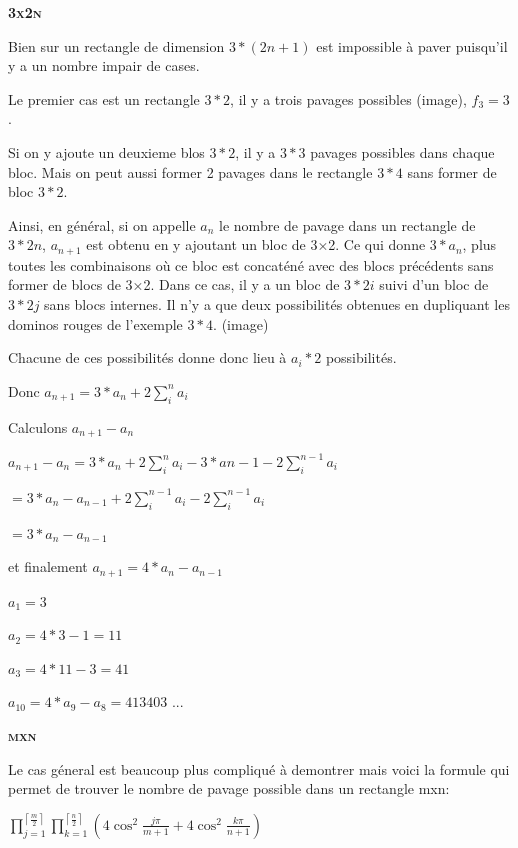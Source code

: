\documentclass{article}
\begin{document}
\hspace{1.5cm}

\textbf{\textsc{3x2n}}

Bien sur un rectangle de dimension $3*(2n+1)$ est impossible à paver puisqu'il y a un nombre impair de cases.

Le premier cas est un rectangle $3*2$, il y a trois pavages possibles (image), $f_{3} = 3$.

Si on y ajoute un deuxieme blos $3*2$, il y a $3*3$ pavages possibles dans chaque bloc.
Mais on peut aussi former 2 pavages dans le rectangle $3*4$ sans former de bloc $3*2$.

Ainsi, en général, si on appelle $a_{n}$ le nombre de pavage dans un rectangle de $3*2n$, $a_{n+1}$ est obtenu en y ajoutant un bloc de 3×2.
Ce qui donne $3*a_{n}$, plus toutes les combinaisons où ce bloc est concaténé avec des blocs précédents sans former de blocs de 3×2.
Dans ce cas, il y a un bloc de $3*2i$ suivi d'un bloc de $3*2j$ sans blocs internes. Il n'y a que deux possibilités obtenues en dupliquant les dominos rouges de l'exemple $3*4$. (image)

Chacune de ces possibilités donne donc lieu à $a_{i}*2$ possibilités.

Donc $a_{n+1} = 3*a_{n} + 2\sum_{i}^{n}a_{i}$

Calculons $a_{n+1} - a_{n}$

$a_{n+1} - a_{n}   = 3*a_{n} + 2\sum_{i}^{n}a_{i} - 3*an-1 - 2\sum_{i}^{n-1}a_{i}$

$= 3*a_{n} - a_{n-1} + 2\sum_{i}^{n-1}a_{i} - 2\sum_{i}^{n-1}a_{i}$

$= 3*a_{n} - a_{n-1}$

et finalement $a_{n+1} = 4*a_{n} - a_{n-1}$

$a_{1} = 3$

$a_{2} = 4*3 - 1 = 11$

$a_{3} = 4*11 - 3 = 41$

$a_{10} = 4*a_{9} - a_{8} = 413403$ ...


\hspace{1.5cm}

\textbf{\textsc{mxn}}

Le cas géneral est beaucoup plus compliqué à demontrer mais voici la formule qui permet de trouver le nombre de pavage possible dans un rectangle mxn:

\begin{center}
    $\prod_{j=1}^{\left \lceil \frac{m}{2} \right \rceil} \prod_{k=1}^{\left \lceil \frac{n}{2} \right \rceil}\left ( 4\cos^{2}\frac{j\pi }{m+1}+4\cos^{2}\frac{k\pi }{n+1} \right )$
\end{center}
\end{document}
